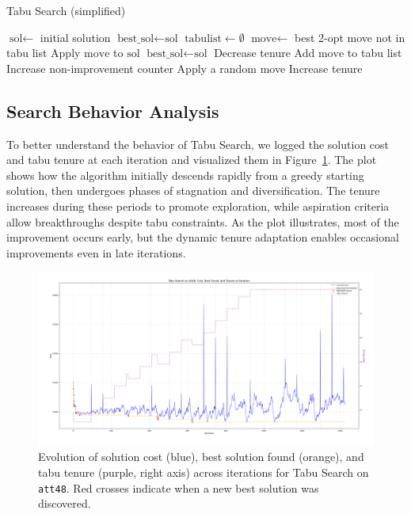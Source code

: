\begin{algorithm}[H]
\caption{Tabu Search (simplified)}
\begin{algorithmic}
    \State $\text{sol} \gets$ initial solution
    \State $\text{best\_sol} \gets \text{sol}$
    \State $\text{tabulist} \gets \emptyset$
        \State $\text{move} \gets$ best 2-opt move not in tabu list
        \State Apply $\text{move}$ to $\text{sol}$
            \State $\text{best\_sol} \gets \text{sol}$
                \State Decrease tenure
            \EndIf
        \Else
            \State Add $\text{move}$ to tabu list
            \State Increase non-improvement counter
        \EndIf
            \State Apply a random move
                \State Increase tenure
            \EndIf
        \EndIf
    \EndWhile
\end{algorithmic}
\end{algorithm}

\subsection{Search Behavior Analysis}

To better understand the behavior of Tabu Search, we logged the solution cost and tabu tenure at each iteration and visualized them in Figure~\ref{fig:tabu_plot}. The plot shows how the algorithm initially descends rapidly from a greedy starting solution, then undergoes phases of stagnation and diversification. The tenure increases during these periods to promote exploration, while aspiration criteria allow breakthroughs despite tabu constraints. As the plot illustrates, most of the improvement occurs early, but the dynamic tenure adaptation enables occasional improvements even in late iterations.

\begin{figure}[H]
    \centering
    \includegraphics[width=\textwidth]{images/tabu_run_att48.png}
    \caption{Evolution of solution cost (blue), best solution found (orange), and tabu tenure (purple, right axis) across iterations for Tabu Search on \texttt{att48}. Red crosses indicate when a new best solution was discovered.}
    \label{fig:tabu_plot}
\end{figure}

